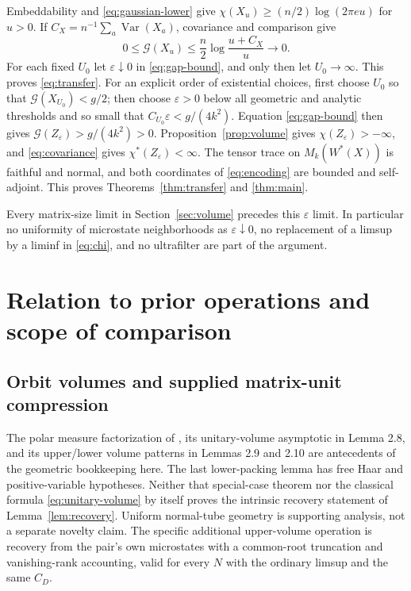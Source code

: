 \documentclass[11pt]{article}
\theoremstyle{definition}\newtheorem{definition}[theorem]{Definition}
\theoremstyle{remark}\newtheorem{remark}[theorem]{Remark}
\newcommand{\eps}{\varepsilon}\newcommand{\id}{\mathrm{id}}
\newcommand{\gap}{\mathcal G}\newcommand{\Enc}{E_{\eps}}
\begin{document}
Embeddability and \eqref{eq:gaussian-lower} give
$\chi(X_u)\geq(n/2)\log(2\pi e u)$ for $u>0$. If
$C_X=n^{-1}\sum_a\operatorname{Var}(X_a)$, covariance and comparison
give
\begin{equation}\label{eq:large-noise-gap}
 0\leq\gap(X_u)\leq\frac n2\log\frac{u+C_X}{u}\longrightarrow0.
\end{equation}
For each fixed $U_0$ let $\eps\downarrow0$ in
\eqref{eq:gap-bound}, and only then let $U_0\to\infty$.
This proves \eqref{eq:transfer}.
For an explicit order of existential choices, first choose $U_0$ so
that $\gap(X_{U_0})<g/2$; then choose $\eps>0$ below all geometric
and analytic thresholds and so small that
$C_{U_0}\eps<g/(4k^2)$. Equation \eqref{eq:gap-bound} then gives
$\gap(Z_\eps)>g/(4k^2)>0$.
Proposition~\ref{prop:volume} gives $\chi(Z_\eps)>-\infty$, and
\eqref{eq:covariance} gives $\chi^*(Z_\eps)<\infty$.
The tensor trace on $M_k(W^*(X))$ is faithful and normal, and both
coordinates of \eqref{eq:encoding} are bounded and self-adjoint.
This proves Theorems~\ref{thm:transfer} and \ref{thm:main}.

Every matrix-size limit in Section~\ref{sec:volume} precedes this
$\eps$ limit. In particular no uniformity of microstate neighborhoods
as $\eps\downarrow0$, no replacement of a limsup by a liminf in
\eqref{eq:chi}, and no ultrafilter are part of the argument.

\section{Relation to prior operations and scope of comparison}
\label{sec:comparison}
\subsection{Orbit volumes and supplied matrix-unit compression}
The polar measure factorization of \cite[Lemma 2.6]{NSSentropy},
its unitary-volume asymptotic in Lemma 2.8, and its upper/lower volume
patterns in Lemmas 2.9 and 2.10 are antecedents of the geometric
bookkeeping here. The last lower-packing lemma has free Haar and
positive-variable hypotheses. Neither that special-case theorem nor
the classical formula \eqref{eq:unitary-volume} by itself proves the
intrinsic recovery statement of Lemma~\ref{lem:recovery}. Uniform
normal-tube geometry is supporting analysis, not a separate novelty
claim. The specific additional upper-volume operation is recovery
from the pair's own microstates with a common-root truncation and
vanishing-rank accounting, valid for every $N$ with the ordinary
limsup and the same $C_D$.
\end{document}
